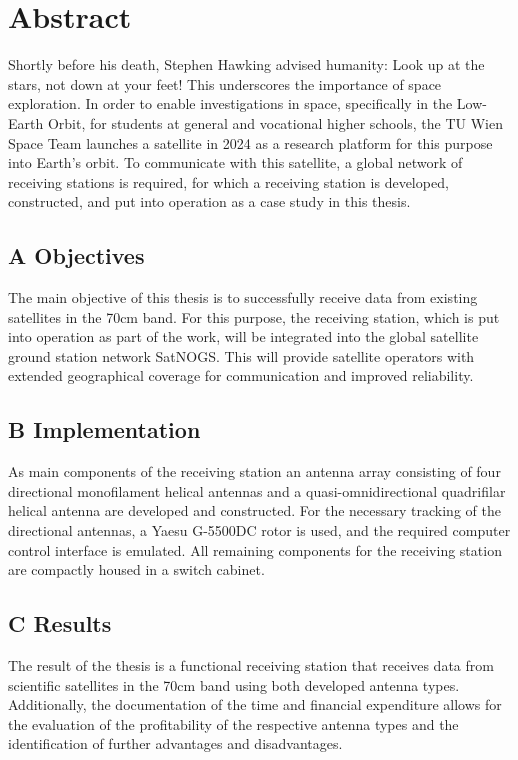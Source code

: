 \section*{Abstract}
\label{chap:abstr}
Shortly before his death, Stephen Hawking advised humanity: \glqq Look up at the stars, not down at your feet!\grqq{} This underscores the importance of space exploration. In order to enable investigations in space, specifically in the Low-Earth Orbit, for students at general and vocational higher schools, the TU Wien Space Team launches a satellite in 2024 as a research platform for this purpose into Earth's orbit. To communicate with this satellite, a global network of receiving stations is required, for which a receiving station is developed, constructed, and put into operation as a case study in this thesis.

\subsection*{A Objectives}
The main objective of this thesis is to successfully receive data from existing satellites in the 70cm band. For this purpose, the receiving station, which is put into operation as part of the work, will be integrated into the global satellite ground station network SatNOGS. This will provide satellite operators with extended geographical coverage for communication and improved reliability.

\subsection*{B Implementation}
As main components of the receiving station an antenna array consisting of four directional monofilament helical antennas and a quasi-omnidirectional quadrifilar helical antenna are developed and constructed. For the necessary tracking of the directional antennas, a Yaesu G-5500DC rotor is used, and the required computer control interface is emulated. All remaining components for the receiving station are compactly housed in a switch cabinet.

\subsection*{C Results}
The result of the thesis is a functional receiving station that receives data from scientific satellites in the 70cm band using both developed antenna types. Additionally, the documentation of the time and financial expenditure allows for the evaluation of the profitability of the respective antenna types and the identification of further advantages and disadvantages.